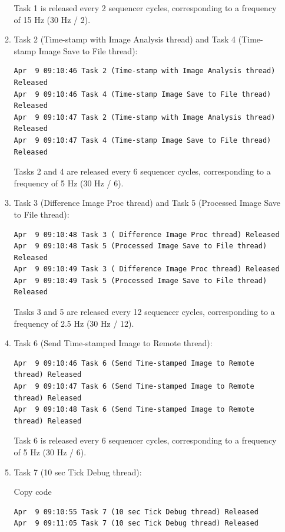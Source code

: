 \documentclass[a4paper,11pt]{article}%
\newenvironment{qanda}{\setlength{\parindent}{0pt}}{\bigskip}
\begin{document}
\begin{qanda}
\begin{enumerate}
\begin{enumerate}
				      Task 1 is released every 2 sequencer cycles, corresponding to a frequency of 15 Hz (30 Hz / 2).
				\item Task 2 (Time-stamp with Image Analysis thread) and Task 4 (Time-stamp Image Save to File thread):

				      \begin{lstlisting}
Apr  9 09:10:46 Task 2 (Time-stamp with Image Analysis thread) Released
Apr  9 09:10:46 Task 4 (Time-stamp Image Save to File thread) Released
Apr  9 09:10:47 Task 2 (Time-stamp with Image Analysis thread) Released
Apr  9 09:10:47 Task 4 (Time-stamp Image Save to File thread) Released
				\end{lstlisting}

				      Tasks 2 and 4 are released every 6 sequencer cycles, corresponding to a frequency of 5 Hz (30 Hz / 6).
				\item Task 3 (Difference Image Proc thread) and Task 5 (Processed Image Save to File thread):


				      \begin{lstlisting}
Apr  9 09:10:48 Task 3 ( Difference Image Proc thread) Released
Apr  9 09:10:48 Task 5 (Processed Image Save to File thread) Released
Apr  9 09:10:49 Task 3 ( Difference Image Proc thread) Released
Apr  9 09:10:49 Task 5 (Processed Image Save to File thread) Released
				\end{lstlisting}

				      Tasks 3 and 5 are released every 12 sequencer cycles, corresponding to a frequency of 2.5 Hz (30 Hz / 12).
				\item Task 6 (Send Time-stamped Image to Remote thread):

				      \begin{lstlisting}
Apr  9 09:10:46 Task 6 (Send Time-stamped Image to Remote thread) Released
Apr  9 09:10:47 Task 6 (Send Time-stamped Image to Remote thread) Released
Apr  9 09:10:48 Task 6 (Send Time-stamped Image to Remote thread) Released
				\end{lstlisting}

				      Task 6 is released every 6 sequencer cycles, corresponding to a frequency of 5 Hz (30 Hz / 6).
				\item Task 7 (10 sec Tick Debug thread):


				      Copy code
				      \begin{lstlisting}
Apr  9 09:10:55 Task 7 (10 sec Tick Debug thread) Released
Apr  9 09:11:05 Task 7 (10 sec Tick Debug thread) Released
\end{lstlisting}


\end{enumerate}
\end{enumerate}
\end{qanda}
\end{document}
